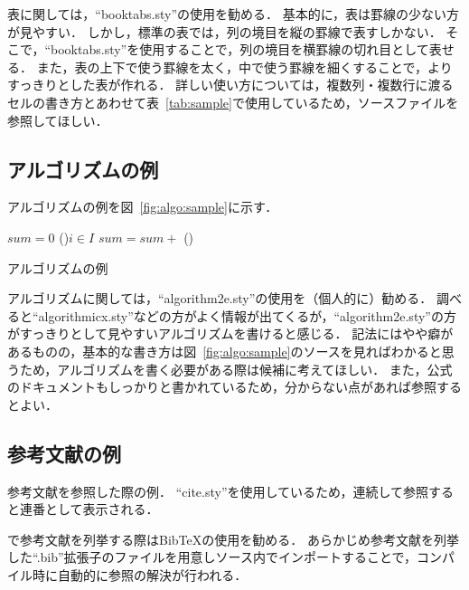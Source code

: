 \documentclass{ipsj}
\newcommand{\Fig}[1]{図~#1}
\newcommand{\Tab}[1]{表~#1}
\begin{document}
  表に関しては，``booktabs.sty''の使用を勧める．
  基本的に，表は罫線の少ない方が見やすい．
  しかし，{\LaTeXe}標準の表では，列の境目を縦の罫線で表すしかない．
  そこで，``booktabs.sty''を使用することで，列の境目を横罫線の切れ目として表せる．
  また，表の上下で使う罫線を太く，中で使う罫線を細くすることで，よりすっきりとした表が作れる．
  詳しい使い方については，複数列・複数行に渡るセルの書き方とあわせて\Tab{\ref{tab:sample}}で使用しているため，ソースファイルを参照してほしい．
  
  \subsection{アルゴリズムの例}
  アルゴリズムの例を\Fig{\ref{fig:algo:sample}}に示す．
  
    \begin{algorithm}[t]
    \small
    \DontPrintSemicolon
    $sum = 0$\;
    \ForEach(){$i \in I$}{
      $sum = sum +$ 
    }
   	\BlankLine
   	\Proc(){}{
    }
    \caption{アルゴリズムの例}
    \label{fig:algo:sample}
    \end{algorithm}
  
  アルゴリズムに関しては，``algorithm2e.sty''の使用を（個人的に）勧める．
  調べると``algorithmicx.sty''などの方がよく情報が出てくるが，``algorithm2e.sty''の方がすっきりとして見やすいアルゴリズムを書けると感じる．
  記法にはやや癖があるものの，基本的な書き方は\Fig{\ref{fig:algo:sample}}のソースを見ればわかると思うため，アルゴリズムを書く必要がある際は候補に考えてほしい．
  また，公式のドキュメントもしっかりと書かれているため，分からない点があれば参照するとよい．
  
  \subsection{参考文献の例}
  参考文献を参照した際の例\cite{book:Aho2006,icde:Diao2002,new-gen-comp:Kowalski1989,tech:Hopcroft1971,url:grep}．
  ``cite.sty''を使用しているため，連続して参照すると連番として表示される．
  
  {\LaTeXe}で参考文献を列挙する際はBibTeXの使用を勧める．
  あらかじめ参考文献を列挙した``.bib''拡張子のファイルを用意し{\LaTeXe}ソース内でインポートすることで，コンパイル時に自動的に参照の解決が行われる．
  
\end{document}
